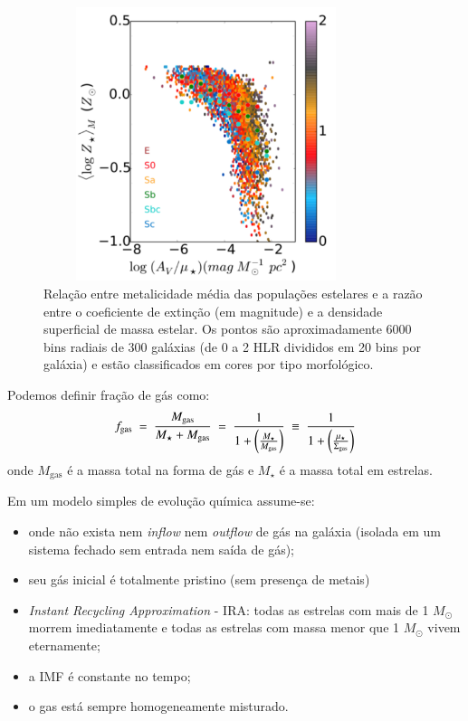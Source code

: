 \begin{figure}
	\centering
	\includegraphics[height = 8cm, width = 9.5cm]{figuras/dust2stars.pdf}
	\caption[$A_V / \mu_\star$ vs. ]
	{Relação entre metalicidade média das populações estelares e a razão entre o coeficiente de
extinção (em magnitude) e a densidade superficial de massa estelar. Os pontos são aproximadamente
6000 bins radiais de 300 galáxias (de 0 a 2 HLR divididos em 20 bins por galáxia) e estão
classificados em cores por tipo morfológico.}
	\label{fig:dust2stars}
\end{figure}

Podemos definir fração de gás como:
\begin{equation}
	f_{\mathrm{gas}}\ =\ \frac{M_{\mathrm{gas}}}{M_\star + M_{\mathrm{gas}}}\ =\ \frac{1}{1 +
	\left(\frac{M_\star}{M_{\mathrm{gas}}}\right)}\ \equiv\ \frac{1}{1 +
	\left(\frac{\mu_\star}{\SigmaGas}\right)}
	\label{eq:fgas}
\end{equation}
\noindent onde $M_{\mathrm{gas}}$ é a massa total na forma de gás e $M_\star$ é a massa total em
estrelas. 

Em um modelo simples de evolução química assume-se:
\begin{itemize}
	\setlength\itemsep{0.2cm}
  	\item onde não exista nem {\em inflow} nem {\em outflow} de gás na galáxia (isolada em um sistema
fechado sem entrada nem saída de gás);
  	\item seu gás inicial é totalmente pristino (sem presença de metais)
  	\item {\em Instant Recycling Approximation} - IRA: todas as estrelas com mais de 1 $M_\odot$
morrem imediatamente e todas as estrelas com massa menor que 1 $M_\odot$ vivem eternamente;
	\item a IMF é constante no tempo;
	\item o gas está sempre homogeneamente misturado.
\end{itemize}

